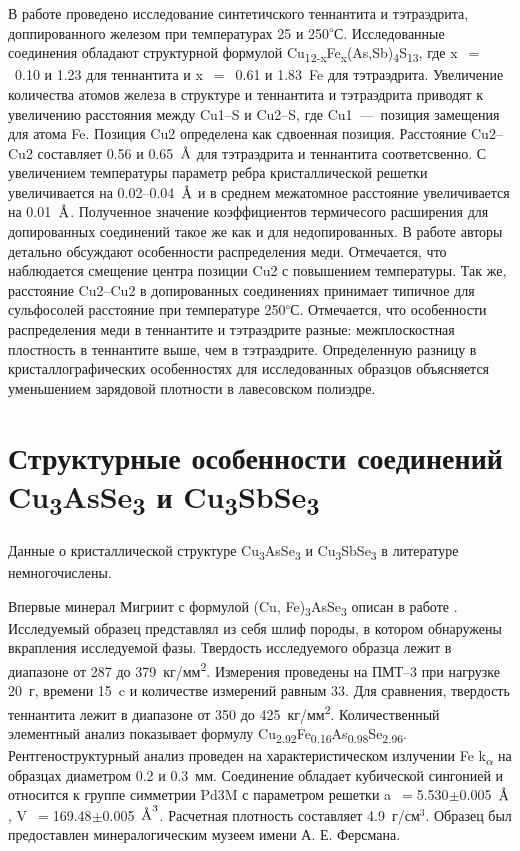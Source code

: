 В работе \cite{Friese2008} проведено исследование синтетичского теннантита и тэтраэдрита, доппированного железом при температурах 25 и 250\textsuperscript{$\circ$}С. Исследованные соединения обладают структурной формулой Cu\textsubscript{12-x}Fe\textsubscript{x}(As,Sb)\textsubscript{4}S\textsubscript{13}, где  x~$=$~0.10 и 1.23 для теннантита  и  x~$=$~0.61 и 1.83~Fe для тэтраэдрита.
 Увеличение количества атомов железа в структуре и теннантита и тэтраэдрита приводят к увеличению расстояния между Cu1--S и Cu2--S, где Cu1~---~позиция замещения для атома Fe. Позиция Cu2 определена как сдвоенная позиция. Расстояние Cu2--Cu2 составляет 0.56 и 0.65~$\mbox{\normalfont\AA}$ для тэтраэдрита и теннантита соответсвенно. С увеличением температуры параметр ребра кристаллической решетки увеличивается на 0.02--0.04~$\mbox{\normalfont\AA}$ и в среднем межатомное расстояние увеличивается на 0.01~$\mbox{\normalfont\AA}$. Полученное значение коэффициентов термичесого расширения для допированных соединений такое же как и для недопированных.
 В работе авторы детально обсуждают особенности распределения меди. Отмечается, что наблюдается смещение центра позиции Cu2 с повышением температуры. Так же, расстояние Cu2--Cu2 в допированных соединениях принимает типичное для сульфосолей расстояние при температуре 250\textsuperscript{$\circ$}С. Отмечается, что особенности распределения меди в теннантите и тэтраэдрите разные: 
межплоскостная плостность в теннантите выше, чем в тэтраэдрите. Определенную разницу в кристаллографических особенностях для исследованных образцов объясняется уменьшением зарядовой плотности в лавесовском полиэдре. 
\newpage

\section{Структурные особенности соединений Cu\textsubscript{3}AsSe\textsubscript{3} и Cu\textsubscript{3}SbSe\textsubscript{3}} \label{sect1_2}

Данные о кристаллической структуре Cu\textsubscript{3}AsSe\textsubscript{3} и Cu\textsubscript{3}SbSe\textsubscript{3} в литературе немногочислены.

Впервые минерал Мигриит с формулой (Cu, Fe)\textsubscript{3}AsSe\textsubscript{3} описан в работе \cite{Dymlcov_1983}. Исследуемый образец представлял из себя шлиф породы, в котором обнаружены вкрапления исследуемой фазы. Твердость исследуемого образца лежит в диапазоне от 287 до 379~кг/мм\textsuperscript{2}. Измерения проведены на ПМТ--3 при нагрузке 20~г, времени 15~c и количестве измерений равным 33. Для сравнения, твердость теннантита лежит в диапазоне от 350 до 425~кг/мм\textsuperscript{2}. Количественный элементный анализ показывает формулу Cu\textsubscript{2.92}Fe\textsubscript{0.16}As\textsubscript{0.98}Se\textsubscript{2.96}. Рентгеноструктурный анализ проведен на характеристическом излучении Fe k\textsubscript{$\alpha$} на образцах диаметром 0.2 и 0.3~мм. Соединение обладает кубической сингонией и относится к группе симметрии Pd3M с параметром решетки a~$=$5.530$\pm$0.005~$\mbox{\normalfont\AA}$, V~$=$169.48$\pm$0.005~$\mbox{\normalfont\AA}^{3}$. Расчетная плотность составляет 4.9~г/см$^{3}$. Образец был предоставлен минералогическим музеем имени А. Е. Ферсмана.

